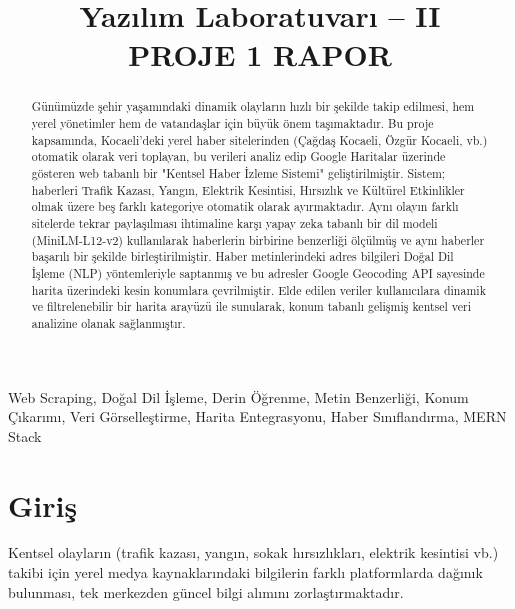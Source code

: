 \documentclass[conference]{IEEEtran}
\begin{document}
    \title{Yazılım Laboratuvarı – II {\\}
        PROJE 1 RAPOR}

    \author{
    }

    \maketitle

    \begin{abstract}
        Günümüzde şehir yaşamındaki dinamik olayların hızlı bir şekilde takip edilmesi, hem yerel yönetimler hem de vatandaşlar için büyük önem taşımaktadır. Bu proje kapsamında, Kocaeli'deki yerel haber sitelerinden (Çağdaş Kocaeli, Özgür Kocaeli, vb.) otomatik olarak veri toplayan, bu verileri analiz edip Google Haritalar üzerinde gösteren web tabanlı bir "Kentsel Haber İzleme Sistemi" geliştirilmiştir. Sistem; haberleri Trafik Kazası, Yangın, Elektrik Kesintisi, Hırsızlık ve Kültürel Etkinlikler olmak üzere beş farklı kategoriye otomatik olarak ayırmaktadır. Aynı olayın farklı sitelerde tekrar paylaşılması ihtimaline karşı yapay zeka tabanlı bir dil modeli (MiniLM-L12-v2) kullanılarak haberlerin birbirine benzerliği ölçülmüş ve aynı haberler başarılı bir şekilde birleştirilmiştir. Haber metinlerindeki adres bilgileri Doğal Dil İşleme (NLP) yöntemleriyle saptanmış ve bu adresler Google Geocoding API sayesinde harita üzerindeki kesin konumlara çevrilmiştir. Elde edilen veriler kullanıcılara dinamik ve filtrelenebilir bir harita arayüzü ile sunularak, konum tabanlı gelişmiş kentsel veri analizine olanak sağlanmıştır.
    \end{abstract}

    \begin{IEEEkeywords}
        Web Scraping, Do{\u g}al Dil {\.I}{\c s}leme, Derin {\"O}{\u g}renme, Metin Benzerli{\u g}i, Konum {\c C}{\i}kar{\i}m{\i}, Veri G{\"o}rselle{\c s}tirme, Harita Entegrasyonu, Haber S{\i}n{\i}fland{\i}rma, MERN Stack
    \end{IEEEkeywords}

    \section{Giri{\c s}}
    Kentsel olaylar{\i}n (trafik kazas{\i}, yang{\i}n, sokak h{\i}rs{\i}zl{\i}klar{\i}, elektrik kesintisi vb.) takibi i{\c c}in yerel medya kaynaklar{\i}ndaki bilgilerin farkl{\i} platformlarda da{\u g}{\i}n{\i}k bulunmas{\i}, tek merkezden g{\"u}ncel bilgi al{\i}m{\i}n{\i} zorla{\c s}t{\i}rmaktad{\i}r.
\end{document}
